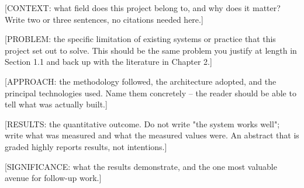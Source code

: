 %
%


[CONTEXT: what field does this project belong to, and why does it
matter? Write two or three sentences, no citations needed here.]

[PROBLEM: the specific limitation of existing systems or practice that
this project set out to solve. This should be the same problem you
justify at length in Section 1.1 and back up with the literature in
Chapter 2.]

[APPROACH: the methodology followed, the architecture adopted, and the
principal technologies used. Name them concretely -- the reader should
be able to tell what was actually built.]

[RESULTS: the quantitative outcome. Do not write "the system works
well"; write what was measured and what the measured values were. An
abstract that is graded highly reports results, not intentions.]

[SIGNIFICANCE: what the results demonstrate, and the one most valuable
avenue for follow-up work.]

\clearpage
